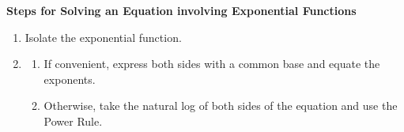 \smallskip

\colorbox{ResultColor}{\bbm

\centerline{\textbf{Steps for Solving an Equation involving Exponential Functions}} 

\begin{enumerate}

\item  Isolate the exponential function.

\item  

\begin{enumerate}

\item  If convenient, express both sides with a common base and equate the exponents.

\item  Otherwise, take the natural log of both sides of the equation and use the Power Rule.


\end{enumerate}


\end{enumerate}

\ebm}

\smallskip


